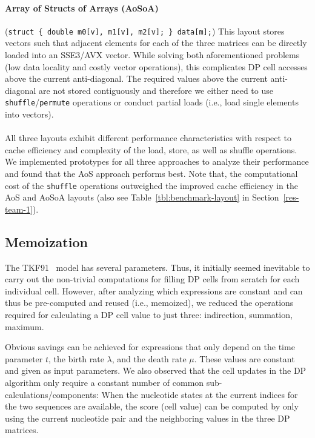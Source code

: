 \documentclass[runningheads,a4paper]{llncs}
\begin{document}
\paragraph*{Array of Structs of Arrays (AoSoA)} ({\small\texttt{struct \{ double m0[v],
m1[v], m2[v]; \} data[m];}}) This layout stores vectors such that
adjacent elements for each of the three matrices can be directly loaded into an SSE3/AVX vector. %
While solving both aforementioned problems (low data locality and costly vector operations),
this complicates DP cell accesses above the current anti-diagonal.
The required values above the current anti-diagonal are not stored contiguously
and therefore we either need to use \texttt{shuffle}/\texttt{permute} operations
or conduct partial loads (i.e., load single elements into vectors).

\paragraph*{} All three layouts exhibit different performance characteristics with respect to
cache efficiency and complexity of the load, store, as well as shuffle operations.
We implemented prototypes for all three approaches to analyze their
performance and found that the AoS approach performs best.
Note that, the computational cost of the \texttt{shuffle} operations outweighed the improved cache efficiency in the AoS and
AoSoA layouts (also see Table~\ref{tbl:benchmark-layout} in Section~\ref{res-team-1}).


\subsection{Memoization}
\label{ssec:memo}

The TKF91~\cite{TKF91} model
has several parameters. Thus, it initially seemed inevitable to carry out the non-trivial computations for filling DP cells
from scratch for each individual cell.
However, after analyzing which expressions are constant and can thus be pre-computed and reused (i.e., memoized),
we reduced the operations required for calculating a DP cell value to just three: indirection, summation, maximum.

Obvious savings can be achieved for expressions that only depend on the time parameter $t$,
the birth rate $\lambda$, and the death rate $\mu$.
These values are constant and given as input parameters.
We also observed that the cell updates in the DP algorithm only require a constant number of common sub-calculations/components:
When the nucleotide states at the current indices for the two sequences are available,
the score (cell value) can be computed by only using the current nucleotide pair and the
neighboring values in the three DP matrices.
\end{document}
